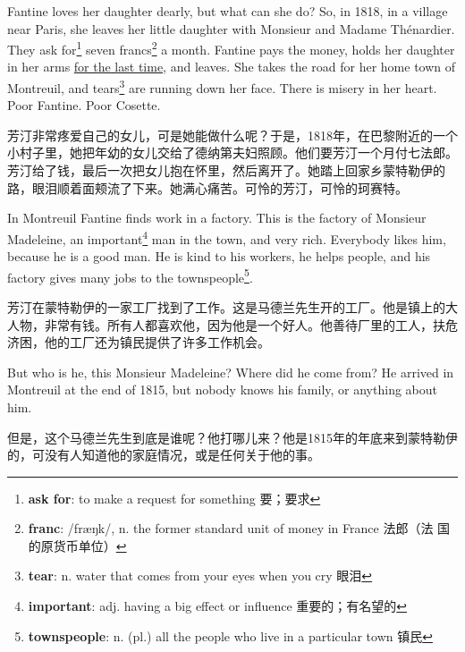 \documentclass[fontset=ubuntu, zihao=5]{ctexart}
\newcommand\doulos[1]{{\fontspec{Doulos SIL} /#1/}}
\begin{document}
\begin{paracol}{2}
  \switchcolumn*

  Fantine loves her daughter dearly, but what can she do? So, in 1818, in a
  village near Paris, she leaves her little daughter with Monsieur and
  Madame Thénardier. They ask for\footnote{\textbf{ask for}: to make a
    request for something 要；要求} seven francs\footnote{\textbf{franc}:
    \doulos{fræŋk}, n. the former standard unit of money in France 法郎（法
    国的原货币单位）} a month. Fantine pays the money, holds her daughter in
  her arms \uline{for the last time}, and leaves. She takes the road for her
  home town of Montreuil, and tears\footnote{\textbf{tear}: n. water that
    comes from your eyes when you cry 眼泪} are running down her face. There
  is misery in her heart. Poor Fantine. Poor Cosette.

  \switchcolumn

  芳汀非常疼爱自己的女儿，可是她能做什么呢？于是，1818年，在巴黎附近的一个小村子里，她把年幼的女儿交给了德纳第夫妇照顾。他们要芳汀一个月付七法郎。芳汀给了钱，最后一次把女儿抱在怀里，然后离开了。她踏上回家乡蒙特勒伊的路，眼泪顺着面颊流了下来。她满心痛苦。可怜的芳汀，可怜的珂赛特。

  \switchcolumn*

  In Montreuil Fantine finds work in a factory. This is the factory of
  Monsieur Madeleine, an important\footnote{\textbf{important}: adj. having a
    big effect or influence 重要的；有名望的} man in the town, and very rich.
  Everybody likes him, because he is a good man. He is kind to his workers, he
  helps people, and his factory gives many jobs to the
  townspeople\footnote{\textbf{townspeople}: n. (pl.) all the people who live
    in a particular town 镇民}.

  \switchcolumn

  芳汀在蒙特勒伊的一家工厂找到了工作。这是马德兰先生开的工厂。他是镇上的大人物，非常有钱。所有人都喜欢他，因为他是一个好人。他善待厂里的工人，扶危济困，他的工厂还为镇民提供了许多工作机会。

  \switchcolumn*

  But who is he, this Monsieur Madeleine? Where did he come from? He arrived in Montreuil at the end of 1815, but nobody knows his family, or anything about him.

  \switchcolumn

  但是，这个马德兰先生到底是谁呢？他打哪儿来？他是1815年的年底来到蒙特勒伊的，可没有人知道他的家庭情况，或是任何关于他的事。



  \switchcolumn*


\end{paracol}
\end{document}
